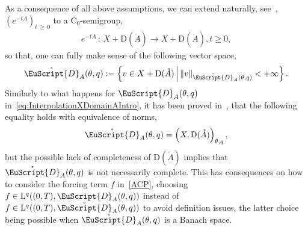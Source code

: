 \documentclass[AHL,Unicode,longabstracts,published]{cedram}
\newcommand{\rmD}{\mathrm{D}}
\newcommand{\rmL}{\mathrm{L}}
\newcommand{\rmC}{\mathrm{C}}
\newcommand{\rgA}{\mathring{A}}
\newcommand{\rgeusD}{\mathring{\eus{D}}}
\newcommand{\eus}{\EuScript}
\begin{document}
As a consequence of all above assumptions, we can extend naturally, see~\cite[Remark~2.7]{DanchinHieberMuchaTolk2020}, $(e^{-tA})_{t\,\geqslant\,0}$ to a $\rmC _0$-semigroup,
\begin{align*}
e^{-tA}\,:\, X+\rmD(\rgA) \longrightarrow X+\rmD(\rgA), t\geqslant 0,
\end{align*}
so that, one can fully make sense of the following vector space,
\begin{align*}
\rgeusD_{A}(\theta,q):= \left\{ v\in X+\rmD(\rgA)\,\middle|\, \| v\|_{\rgeusD_{A}(\theta,q)}<+\infty \right\} .
\end{align*}
Similarly to what happens for ${\eus{D}}_{A}(\theta,q)$ in~\eqref{eq:InterpolationXDomainAIntro}, it has been proved in~\cite[Proposition~2.12]{DanchinHieberMuchaTolk2020}, that the following equality holds with equivalence of norms,
\begin{align}
\rgeusD_{A}(\theta,q) = \left(X,\rmD(\rgA)\right)_{\theta,q},
\end{align}
but the possible lack of completeness of $\rmD(\rgA)$ implies that $\rgeusD_{A}(\theta,q)$ is not necessarily complete. This has consequences on how to consider the forcing term $f$ in~\eqref{ACP}, choosing $f\in \rmL^q((0,T),{\eus{D}}_{A}(\theta,q))$ instead of $f\in \rmL^q((0,T),\rgeusD_{A}(\theta,q))$ to avoid definition issues, the latter choice being possible when $\rgeusD_{A}(\theta,q)$ is a Banach space.
\end{document}
